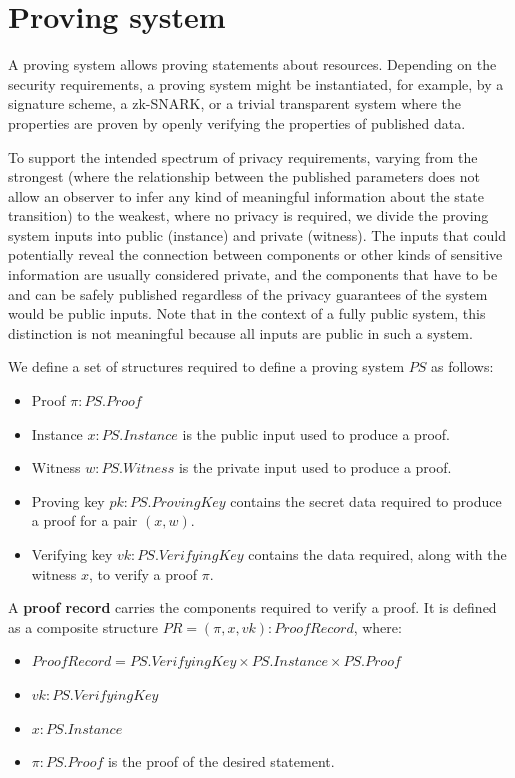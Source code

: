 \documentclass[
    11pt,            %
    techreport,        %
    affiltop,       %
]{art}
\begin{document}
\section{Proving system}

A proving system allows proving statements about resources. Depending on the security requirements, a proving system might be instantiated, for example, by a signature scheme, a zk-SNARK, or a trivial transparent system where the properties are proven by openly verifying the properties of published data.

\label{public-private-inputs}
To support the intended spectrum of privacy requirements, varying from the strongest (where the relationship between the published parameters does not allow an observer to infer any kind of meaningful information about the state transition) to the weakest, where no privacy is required, we divide the proving system inputs into public (instance) and private (witness). The inputs that could potentially reveal the connection between components or other kinds of sensitive information are usually considered private, and the components that have to be and can be safely published regardless of the privacy guarantees of the system would be public inputs. Note that in the context of a fully public system, this distinction is not meaningful because all inputs are public in such a system.

We define a set of structures required to define a proving system $PS$ as follows:
\begin{itemize}
    \item Proof $\pi: PS.Proof$
    \item Instance $x: PS.Instance$ is the public input used to produce a proof.
    \item Witness $w: PS.Witness$ is the private input used to produce a proof.
    \item Proving key $pk: PS.ProvingKey$ contains the secret data required to produce a proof for a pair $(x, w)$. 
    \item Verifying key $vk: PS.VerifyingKey$ contains the data required, along with the witness $x$, to verify a proof $\pi$.
\end{itemize}

A \textbf{proof record} carries the components required to verify a proof. It is defined as a composite structure $PR = (\pi, x, vk): ProofRecord$, where:
\begin{itemize}
    \item $ProofRecord = PS.VerifyingKey \times PS.Instance \times PS.Proof$
    \item $vk: PS.VerifyingKey$
    \item $x: PS.Instance$
    \item $\pi: PS.Proof$ is the proof of the desired statement.
\end{itemize}
\end{document}
